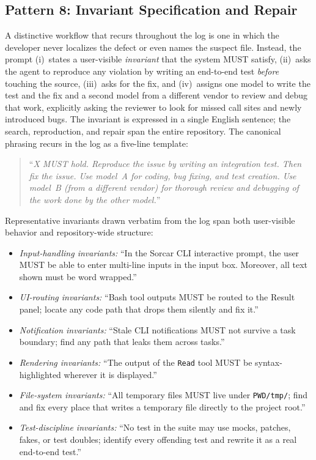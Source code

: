 \documentclass{article}
\begin{document}
\subsection{Pattern 8: Invariant Specification and Repair}
\label{sec:p-invariant}

A distinctive workflow that recurs throughout the log is one in which
the developer never localizes the defect or even names the suspect
file.  Instead, the prompt (i)~states a user-visible \emph{invariant}
that the system MUST satisfy, (ii)~asks the agent to reproduce any
violation by writing an end-to-end test \emph{before} touching the
source, (iii)~asks for the fix, and (iv)~assigns one model to write
the test and the fix and a second model from a different vendor to
review and debug that work, explicitly asking the reviewer to look for
missed call sites and newly introduced bugs.
The invariant is expressed in a single English sentence; the search,
reproduction, and repair span the entire repository.
The canonical phrasing recurs in the log as a five-line template:
\begin{quote}\small
``\emph{X MUST hold.  Reproduce the issue by writing an integration
test.  Then fix the issue.  Use model~A for coding, bug fixing, and
test creation.  Use model~B (from a different vendor) for thorough
review and debugging of the work done by the other model.}''
\end{quote}

\noindent Representative invariants drawn verbatim from the log span
both user-visible behavior and repository-wide structure:
\begin{itemize}[nosep]
  \item \emph{Input-handling invariants:} ``In the Sorcar CLI
        interactive prompt, the user MUST be able to enter multi-line
        inputs in the input box.  Moreover, all text shown must be
        word wrapped.''
  \item \emph{UI-routing invariants:} ``Bash tool outputs MUST be
        routed to the Result panel; locate any code path that drops
        them silently and fix it.''
  \item \emph{Notification invariants:} ``Stale CLI notifications
        MUST not survive a task boundary; find any path that leaks
        them across tasks.''
  \item \emph{Rendering invariants:} ``The output of the \texttt{Read}
        tool MUST be syntax-highlighted wherever it is displayed.''
  \item \emph{File-system invariants:} ``All temporary files MUST live
        under \texttt{PWD/tmp/}; find and fix every place that writes
        a temporary file directly to the project root.''
  \item \emph{Test-discipline invariants:} ``No test in the suite may
        use mocks, patches, fakes, or test doubles; identify every
        offending test and rewrite it as a real end-to-end test.''
\end{itemize}
\end{document}
